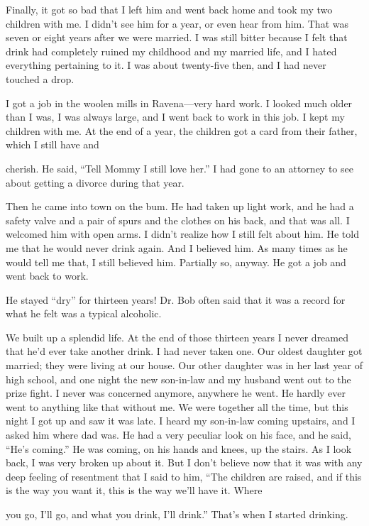 Finally, it got so bad that I left him and went back home and took my two children with me. I didn’t see him for a year, or even hear from him. That was seven or eight years after we were married. I was still bitter because I felt that drink had completely ruined my childhood and my married life, and I hated everything pertaining to it. I was about twenty-five then, and I had never touched a drop.

I got a job in the woolen mills in Ravena—very hard work. I looked much older than I was, I was always large, and I went back to work in this job. I kept my children with me. At the end of a year, the children got a card from their father, which I still have and

cherish. He said, “Tell Mommy I still love her.” I had gone to an attorney to see about getting a divorce during that year.

Then he came into town on the bum. He had taken up light work, and he had a safety valve and a pair of spurs and the clothes on his back, and that was all. I welcomed him with open arms. I didn’t realize how I still felt about him. He told me that he would never drink again. And I believed him. As many times as he would tell me that, I still believed him. Partially so, anyway. He got a job and went back to work.

He stayed “dry” for thirteen years! Dr. Bob often said that it was a record for what he felt was a typical alcoholic.

We built up a splendid life. At the end of those thirteen years I never dreamed that he’d ever take another drink. I had never taken one. Our oldest daughter got married; they were living at our house. Our other daughter was in her last year of high school, and one night the new son-in-law and my husband went out to the prize fight. I never was concerned anymore, anywhere he went. He hardly ever went to anything like that without me. We were together all the time, but this night I got up and saw it was late. I heard my son-in-law coming upstairs, and I asked him where dad was. He had a very peculiar look on his face, and he said, “He’s coming.” He was coming, on his hands and knees, up the stairs. As I look back, I was very broken up about it. But I don’t believe now that it was with any deep feeling of resentment that I said to him, “The children are raised, and if this is the way you want it, this is the way we’ll have it. Where

you go, I’ll go, and what you drink, I’ll drink.” That’s when I started drinking.

